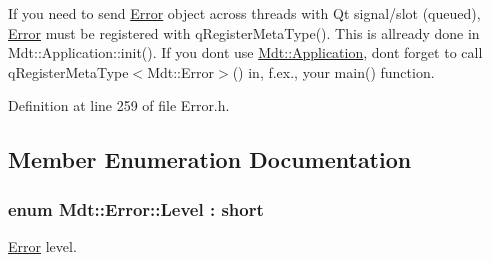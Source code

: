 If you need to send \hyperlink{class_mdt_1_1_error}{Error} object across threads with Qt signal/slot (queued), \hyperlink{class_mdt_1_1_error}{Error} must be registered with q\+Register\+Meta\+Type(). This is allready done in Mdt\+::\+Application\+::init(). If you don\textquotesingle{}t use \hyperlink{class_mdt_1_1_application}{Mdt\+::\+Application}, don\textquotesingle{}t forget to call q\+Register\+Meta\+Type$<$\+Mdt\+::\+Error$>$() in, f.\+ex., your main() function. 

Definition at line 259 of file Error.\+h.



\subsection{Member Enumeration Documentation}
\subsubsection[{\texorpdfstring{Level}{Level}}]{\setlength{\rightskip}{0pt plus 5cm}enum {\bf Mdt\+::\+Error\+::\+Level} \+: short}\hypertarget{class_mdt_1_1_error_ab533dc690f68a8635232db594194a068}{}\label{class_mdt_1_1_error_ab533dc690f68a8635232db594194a068}


\hyperlink{class_mdt_1_1_error}{Error} level. 

